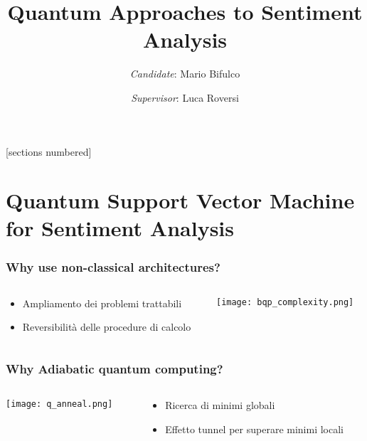 \documentclass[aspectratio=169]{beamer}
\title{Quantum Approaches to Sentiment Analysis}
\author{\emph{Candidate}: Mario Bifulco}
\date{\emph{Supervisor}: Luca Roversi}
\institute{University of Turin}
\begin{document}
[sections numbered]

\begin{frame}
    \titlepage
\end{frame}

\section{Quantum Support Vector Machine for Sentiment Analysis}

\begin{frame}
    \frametitle{Why use non-classical architectures?}

    \begin{columns}
        \begin{column}{0.3\textwidth}
            \begin{itemize}
                \item Ampliamento dei problemi trattabili
                \item Reversibilità delle procedure di calcolo
            \end{itemize}
        \end{column}
        \begin{column}{0.7\textwidth}
            \begin{flushright}
                \texttt{[image: bqp\_complexity.png]}
            \end{flushright}
        \end{column}
    \end{columns}

\end{frame}

\begin{frame}
    \frametitle{Why Adiabatic quantum computing?}

    \begin{columns}
        \begin{column}{0.6\textwidth}
            \begin{flushleft}
                \texttt{[image: q\_anneal.png]}
            \end{flushleft}
        \end{column}
        \begin{column}{0.4\textwidth}
            \begin{itemize}
                \item Ricerca di minimi globali
                \item Effetto tunnel per superare minimi locali
            \end{itemize}
        \end{column}
    \end{columns}

\end{frame}
\end{document}
